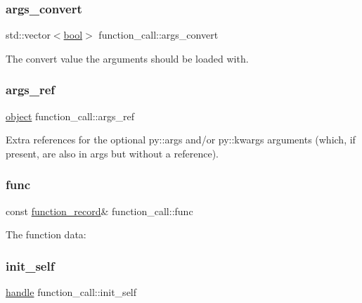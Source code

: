 \subsubsection{\texorpdfstring{args\_convert}{args\_convert}}
{\footnotesize\ttfamily std\+::vector$<$\mbox{\hyperlink{asdl_8h_af6a258d8f3ee5206d682d799316314b1}{bool}}$>$ function\+\_\+call\+::args\+\_\+convert}



The {\ttfamily convert} value the arguments should be loaded with. 

\mbox{\label{structfunction__call_a13ff878b84d1c7a41c0f28c62db36925}} 
\subsubsection{\texorpdfstring{args\_ref}{args\_ref}}
{\footnotesize\ttfamily \mbox{\hyperlink{classobject}{object}} function\+\_\+call\+::args\+\_\+ref}

Extra references for the optional {\ttfamily py\+::args} and/or {\ttfamily py\+::kwargs} arguments (which, if present, are also in {\ttfamily args} but without a reference). \mbox{\label{structfunction__call_afadf98c8478fd2c1958003cedefa38d7}} 
\subsubsection{\texorpdfstring{func}{func}}
{\footnotesize\ttfamily const \mbox{\hyperlink{structfunction__record}{function\+\_\+record}}\& function\+\_\+call\+::func}



The function data\+: 

\mbox{\label{structfunction__call_a8f9e4659cf3ca4be507d2220420b9c00}} 
\subsubsection{\texorpdfstring{init\_self}{init\_self}}
{\footnotesize\ttfamily \mbox{\hyperlink{classhandle}{handle}} function\+\_\+call\+::init\+\_\+self}



